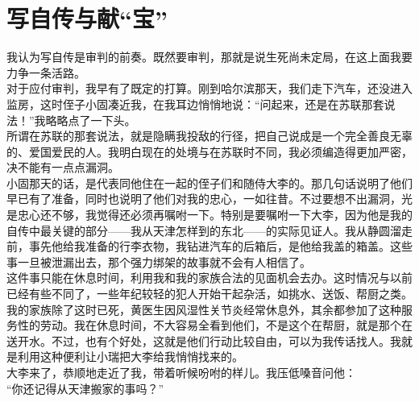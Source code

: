 \fancyhead[RO]{\thepage} %
\fancyhead[LE]{\thepage} %
\chapter*{写自传与献“宝”}
我认为写自传是审判的前奏。既然要审判，那就是说生死尚未定局，在这上面我要力争一条活路。\\

对于应付审判，我早有了既定的打算。刚到哈尔滨那天，我们走下汽车，还没进入监房，这时侄子小固凑近我，在我耳边悄悄地说：“问起来，还是在苏联那套说法！”我略略点了一下头。\\

所谓在苏联的那套说法，就是隐瞒我投敌的行径，把自己说成是一个完全善良无辜的、爱国爱民的人。我明白现在的处境与在苏联时不同，我必须编造得更加严密，决不能有一点点漏洞。\\

小固那天的话，是代表同他住在一起的侄子们和随侍大李的。那几句话说明了他们早已有了准备，同时也说明了他们对我的忠心，一如往昔。不过要想不出漏洞，光是忠心还不够，我觉得还必须再嘱咐一下。特别是要嘱咐一下大李，因为他是我的自传中最关键的部分——我从天津怎样到的东北——的实际见证人。我从静圆溜走前，事先他给我准备的行李衣物，我钻进汽车的后箱后，是他给我盖的箱盖。这些事一旦被泄漏出去，那个强力绑架的故事就不会有人相信了。\\

这件事只能在休息时间，利用我和我的家族合法的见面机会去办。这时情况与以前已经有些不同了，一些年纪较轻的犯人开始干起杂活，如挑水、送饭、帮厨之类。我的家族除了这时已死，黄医生因风湿性关节炎经常休息外，其余都参加了这种服务性的劳动。我在休息时间，不大容易全看到他们，不是这个在帮厨，就是那个在送开水。不过，也有个好处，这就是他们行动比较自由，可以为我传话找人。我就是利用这种便利让小瑞把大李给我悄悄找来的。\\

大李来了，恭顺地走近了我，带着听候吩咐的样儿。我压低嗓音问他：\\

“你还记得从天津搬家的事吗？”\\

